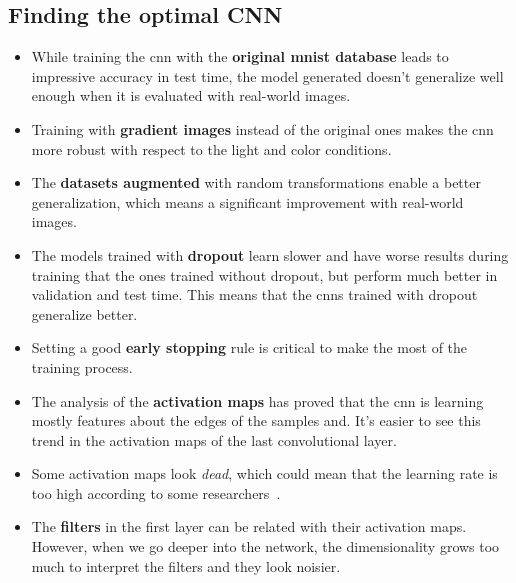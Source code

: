 \subsection*{Finding the optimal CNN}
\begin{itemize}
	\item While training the \gls{cnn} with the \textbf{original \gls{mnist} database} leads to impressive accuracy in test time, the model generated doesn't generalize well enough when it is evaluated with real-world images.
	\item Training with \textbf{gradient images} instead of the original ones makes the \gls{cnn} more robust with respect to the light and color conditions.
	\item The \textbf{datasets augmented} with random transformations enable a better generalization, which means a significant improvement with real-world images.
	\item The models trained with \textbf{dropout} learn slower and have worse results during training that the ones trained without dropout, but perform much better in validation and test time. This means that the \glspl{cnn} trained with dropout generalize better. 
	\item Setting a good \textbf{early stopping} rule is critical to make the most of the training process. 
	\item The analysis of the \textbf{activation maps} has proved that the \gls{cnn} is learning mostly features about the edges of the samples and. It's easier to see this trend in the activation maps of the last convolutional layer.
	\item Some activation maps look \textit{dead}, which could mean that the learning rate is too high according to some researchers~\cite{cs231n}.
	\item The \textbf{filters} in the first layer can be related with their activation maps. However, when we go deeper into the network, the dimensionality grows too much to interpret the filters and they look noisier. 
\end{itemize}

